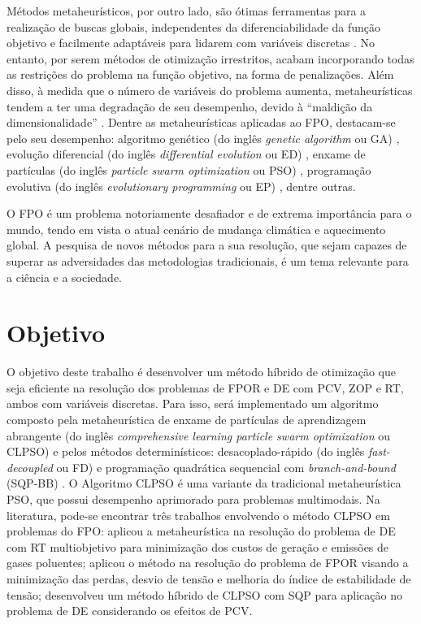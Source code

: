 \documentclass[
	12pt,				%
	openany,			%
	twoside,			%
	a4paper,			%
	chapter=TITLE,		%
	section=Title,		%
	subsection=Title,	%
	subsubsection=Title,%
	english,			%
	french,				%
	spanish,			%
	brazil			%
	]{abntex2}
\begin{document}
\begin{ERRATA}
Métodos metaheurísticos, por outro lado, são ótimas ferramentas para a realização de buscas globais, independentes da diferenciabilidade da função objetivo e facilmente adaptáveis para lidarem com variáveis discretas \cite{psohibrido}. No entanto, por serem métodos de otimização irrestritos, acabam incorporando todas as restrições do problema na função objetivo, na forma de penalizações. Além disso, à medida que o número de variáveis do problema aumenta, metaheurísticas tendem a ter uma degradação de seu desempenho, devido à “maldição da dimensionalidade” \cite{maldicao}.
Dentre as metaheurísticas aplicadas ao FPO, destacam-se pelo seu desempenho: algoritmo genético (do inglês \emph{genetic algorithm}  ou GA) \cite{ga_opf}, evolução diferencial (do inglês \emph{differential evolution} ou ED) \cite{DE}, enxame de partículas (do inglês \emph{particle swarm optimization} ou PSO) \cite{psohibrido}, programação evolutiva (do inglês \emph{evolutionary programming} ou EP) \cite{EP}, dentre outras.

O FPO é um problema notoriamente desafiador e de extrema importância para o mundo, tendo em vista o atual cenário de mudança climática e aquecimento global. A pesquisa de novos métodos para a sua resolução, que sejam capazes de superar as adversidades das metodologias tradicionais, é um tema relevante para a ciência e a sociedade.


\section{Objetivo}

O objetivo deste trabalho é desenvolver um método híbrido de otimização que seja eficiente na resolução dos problemas de FPOR e DE com PCV, ZOP e RT, ambos com variáveis discretas. Para isso, será implementado um algoritmo composto pela metaheurística de enxame de partículas de aprendizagem abrangente (do inglês \emph{comprehensive learning particle swarm optimization} ou CLPSO) \cite{clpso} e pelos métodos determinísticos: desacoplado-rápido (do inglês \emph{fast-decoupled} ou FD) \cite{fdbx} e programação quadrática sequencial com \emph{branch-and-bound} (SQP-BB) \cite{apopt}. O Algoritmo CLPSO é uma variante da tradicional metaheurística PSO, que possui desempenho aprimorado para problemas multimodais. Na literatura, pode-se encontrar três trabalhos envolvendo o método CLPSO em problemas do FPO:  aplicou a metaheurística na resolução do problema de DE com RT multiobjetivo para minimização dos custos de geração e  emissões de gases poluentes;  aplicou o método na resolução do problema de FPOR visando a minimização das perdas, desvio de tensão e melhoria do índice de estabilidade de tensão;   desenvolveu um método híbrido de CLPSO com SQP para aplicação no problema de DE considerando os efeitos de PCV.


\end{ERRATA}
\end{document}
